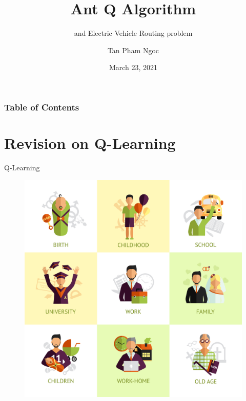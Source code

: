 \documentclass[aspectratio=169,xcolor=dvipsnames]{beamer}
\title[Ant Q Algorithm \& Electric Vehicle Routing Problem]{Ant Q Algorithm}
\subtitle{and Electric Vehicle Routing problem}
\author[Tan Pham Ngoc] {Tan Pham Ngoc}
\institute[UIT] %
{
    Faculty of Computer Science \\
    University of Information Technology, VNU HCM 
    \vskip 3pt
}
\date{March 23, 2021} %
\begin{document}
\begin{frame}
    \titlepage
\end{frame}

\begin{frame}
    \frametitle{Table of Contents}
    \tableofcontents[]
\end{frame}


\section{Revision on Q-Learning}
\begin{frame}{Q-Learning}
    \begin{figure}
        \centering
        \includegraphics[scale = 0.04]{Life cycle.jpg}
        \label{fig:my_label}
    \end{figure}
\end{frame}
\end{document}
